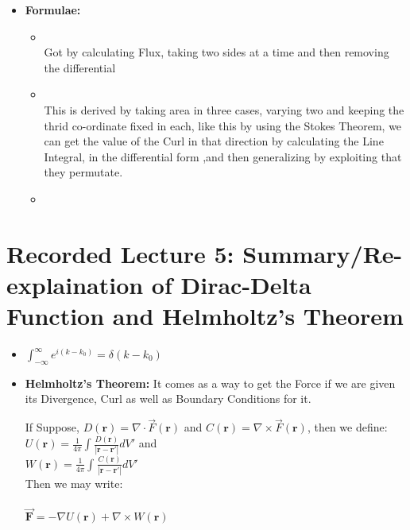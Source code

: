 \documentclass{article}
\begin{document}
\begin{itemize}
  \item \textbf{Formulae:}
  \begin{itemize}
    \item  {}   \\
    Got by calculating Flux, taking two sides at a time and then removing the differential
    \item {} \\
    This is derived by taking area in three cases, varying two and keeping the thrid co-ordinate fixed in each, like this by using the Stokes Theorem, we can get the value of the Curl in that direction by calculating the Line Integral, in the differential form ,and then generalizing by exploiting that they permutate.
    \item
  \end{itemize}
\end{itemize}

\section{Recorded Lecture 5: Summary/Re-explaination of Dirac-Delta Function and Helmholtz's Theorem}

\begin{itemize}
  \item $\int_{- \infty}^{\infty}{e^{i(k-k_0)}} = \delta (k-k_0)$
  \item \textbf{Helmholtz's Theorem:} It comes as a way to get the Force if we are given its Divergence, Curl as well as Boundary Conditions for it.  \\[0.125in]
  \begin{center}
    If Suppose, $D(\mathbf{r}) = \nabla \cdot \vec{F}(\mathbf{r})$ and $C(\mathbf{r}) = \nabla \times \vec{F}(\mathbf{r})$, then we define: \\[0.25in]
        $ U(\mathbf{r}) = \frac{1}{4 \pi} \int_{}^{}{\frac{D(\mathbf{r})}{|\mathbf{r - r'}|}} dV' $ and  \\[0.125in]
        $ W(\mathbf{r}) = \frac{1}{4 \pi} \int_{}^{}{\frac{C(\mathbf{r})}{|\mathbf{r - r'}|}} dV' $  \\[0.125in]
        Then we may write: \\~\\
        $\vec{\mathbf{F}} = -\nabla U(\mathbf{r}) + \nabla \times W(\mathbf{r}) $ 
  \end{center}
\end{itemize}
\end{document}

